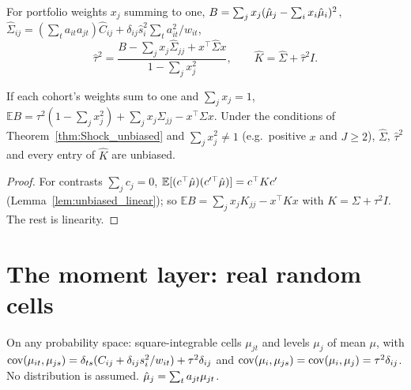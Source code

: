 \begin{definition}\label{def:Shock_tauHat}
  \leanok
  For portfolio weights $x_j$ summing to one, $B = \sum_j x_j(\hat\mu_j - \sum_i x_i\hat\mu_i)^2$,
  $\hat\Sigma_{ij} = (\sum_t a_{it}a_{jt})\hat C_{ij} + \delta_{ij}\hat s_i^2\sum_t a_{it}^2/w_{it}$,
  \[
    \hat\tau^2 = \frac{B - \sum_j x_j\hat\Sigma_{jj} + x^\top\hat\Sigma x}{1 - \sum_j x_j^2},
    \qquad \hat K = \hat\Sigma + \hat\tau^2 I.
  \]
\end{definition}

\begin{theorem}\label{thm:Shock_tauHat}
  \leanok
  If each cohort's weights sum to one and $\sum_j x_j = 1$,
  $\mathbb E B = \tau^2(1 - \sum_j x_j^2) + \sum_j x_j\Sigma_{jj} - x^\top\Sigma x$. Under the
  conditions of Theorem~\ref{thm:Shock_unbiased} and $\sum_j x_j^2 \ne 1$ (e.g.\ positive $x$
  and $J \ge 2$), $\hat\Sigma$, $\hat\tau^2$ and every entry of $\hat K$ are unbiased.
\end{theorem}
\begin{proof}
  \leanok
  For contrasts $\sum_j c_j = 0$, $\mathbb E[(c^\top\hat\mu)(c'^\top\hat\mu)] = c^\top K c'$
  (Lemma~\ref{lem:unbiased_linear}); so $\mathbb E B = \sum_j x_jK_{jj} - x^\top Kx$ with
  $K = \Sigma + \tau^2 I$. The rest is linearity.
\end{proof}

\section*{The moment layer: real random cells}

\begin{definition}\label{def:Shock_Cells}
  \leanok
  On any probability space: square-integrable cells $\mu_{jt}$ and levels $\mu_j$ of mean
  $\mu$, with $\operatorname{cov}(\mu_{it},\mu_{js}) = \delta_{ts}(C_{ij} + \delta_{ij}s_i^2/w_{it})
  + \tau^2\delta_{ij}$ and $\operatorname{cov}(\mu_i,\mu_{js}) = \operatorname{cov}(\mu_i,\mu_j) = \tau^2\delta_{ij}$.
  No distribution is assumed. $\hat\mu_j = \sum_t a_{jt}\mu_{jt}$.
\end{definition}

